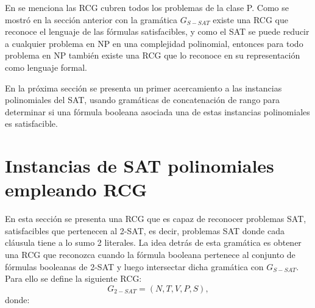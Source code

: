 En \cite{mainRCGBib} se menciona las RCG cubren todos los problemas de la clase P. Como se mostró en la sección anterior con la gramática $G_{S-SAT}$ existe una RCG que reconoce el lenguaje de las fórmulas satisfacibles, y como el SAT se puede reducir a cualquier problema en NP en una complejidad polinomial, entonces para todo problema en NP también existe una RCG que lo reconoce en su representación como lenguaje formal.

En la próxima sección se presenta un primer acercamiento a las instancias polinomiales del SAT, usando gramáticas de concatenación de rango
para determinar si una fórmula booleana asociada una de estas instancias polinomiales es satisfacible.

\section{Instancias de SAT polinomiales empleando RCG}

En esta sección se presenta una RCG que es capaz de reconocer problemas SAT, satisfacibles que pertenecen al 2-SAT, es decir, problemas SAT donde cada cláusula tiene a lo sumo 2 literales. La idea detrás de esta gramática es obtener una RCG que reconozca cuando la fórmula booleana pertenece al conjunto de fórmulas booleanas de 2-SAT y luego intersectar dicha gramática con $G_{S-SAT}$.  Para ello se define la siguiente RCG:
\[
    G_{2-SAT} = (N, T, V, P, S),
\]
donde:

